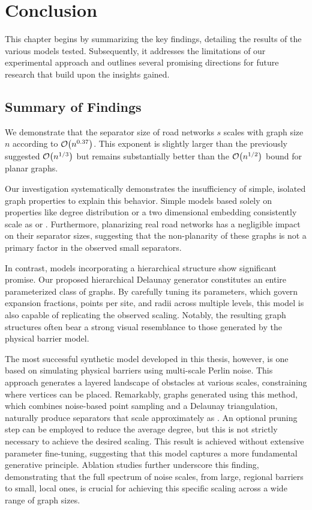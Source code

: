 \chapter{Conclusion}
\label{ch:conclusion}

This chapter begins by summarizing the key findings, detailing the results of the various models tested.
Subsequently, it addresses the limitations of our experimental approach and outlines several promising directions for future research that build upon the insights gained.

\section{Summary of Findings}
\label{sec:conclusion:summary}

We demonstrate that the separator size of road networks \(s\) scales with graph size \(n\) according to \(\mathcal{O}\!\left(n^{0.37}\right)\).
This exponent is slightly larger than the previously suggested \(\mathcal{O}\!\left(n^{1/3}\right)\) \cite{dibbelt_customizable_2016} but remains substantially better than the \(\mathcal{O}\!\left(n^{1/2}\right)\) bound for planar graphs.

Our investigation systematically demonstrates the insufficiency of simple, isolated graph properties to explain this behavior.
Simple models based solely on properties like degree distribution or a two dimensional embedding consistently scale as  or .
Furthermore, planarizing real road networks has a negligible impact on their separator sizes, suggesting that the non-planarity of these graphs is not a primary factor in the observed small separators.

In contrast, models incorporating a hierarchical structure show significant promise.
Our proposed hierarchical Delaunay generator constitutes an entire parameterized class of graphs.
By carefully tuning its parameters, which govern expansion fractions, points per site, and radii across multiple levels, this model is also capable of replicating the observed  scaling.
Notably, the resulting graph structures often bear a strong visual resemblance to those generated by the physical barrier model.

The most successful synthetic model developed in this thesis, however, is one based on simulating physical barriers using multi-scale Perlin noise.
This approach generates a layered landscape of obstacles at various scales, constraining where vertices can be placed.
Remarkably, graphs generated using this method, which combines noise-based point sampling and a Delaunay triangulation, naturally produce separators that scale approximately as .
An optional pruning step can be employed to reduce the average degree, but this is not strictly necessary to achieve the desired scaling.
This result is achieved without extensive parameter fine-tuning, suggesting that this model captures a more fundamental generative principle.
Ablation studies further underscore this finding, demonstrating that the full spectrum of noise scales, from large, regional barriers to small, local ones, is crucial for achieving this specific scaling across a wide range of graph sizes.

